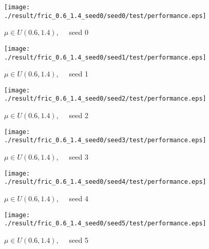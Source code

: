 \begin{figure}[p]
 \begin{minipage}{0.49\hsize}
  \begin{center}
 \texttt{[image: ./result/fric\_0.6\_1.4\_seed0/seed0/test/performance.eps]}
  \caption{$\mu\in U(0.6,1.4)$,~~~seed 0
  }
  \end{center}
 \end{minipage}
 \begin{minipage}{0.49\hsize}
   \begin{center}
 \texttt{[image: ./result/fric\_0.6\_1.4\_seed0/seed1/test/performance.eps]}
  \caption{$\mu\in U(0.6,1.4)$,~~~seed 1
  }
  \end{center}
 \end{minipage}
\end{figure}

\begin{figure}[p]
 \begin{minipage}{0.49\hsize}
  \begin{center}
 \texttt{[image: ./result/fric\_0.6\_1.4\_seed0/seed2/test/performance.eps]}
  \caption{$\mu\in U(0.6,1.4)$,~~~seed 2
  }
  \end{center}
 \end{minipage}
 \begin{minipage}{0.49\hsize}
   \begin{center}
 \texttt{[image: ./result/fric\_0.6\_1.4\_seed0/seed3/test/performance.eps]}
  \caption{$\mu\in U(0.6,1.4)$,~~~seed 3
  }
  \end{center}
 \end{minipage}
\end{figure}

\begin{figure}[p]
 \begin{minipage}{0.49\hsize}
  \begin{center}
 \texttt{[image: ./result/fric\_0.6\_1.4\_seed0/seed4/test/performance.eps]}
  \caption{$\mu\in U(0.6,1.4)$,~~~seed 4
  }
  \end{center}
 \end{minipage}
 \begin{minipage}{0.49\hsize}
   \begin{center}
 \texttt{[image: ./result/fric\_0.6\_1.4\_seed0/seed5/test/performance.eps]}
  \caption{$\mu\in U(0.6,1.4)$,~~~seed 5
  }
  \end{center}
 \end{minipage}
\end{figure}
